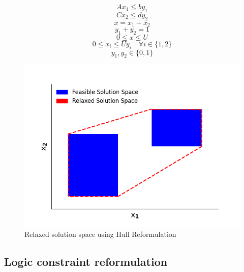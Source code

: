 \documentclass{juliacon}
\begin{document}
\begin{equation}
    \label{eq:ex_hull0}
    Ax_1 \leq by_1
\end{equation}
\begin{equation}
    \label{eq:ex_hull1}
    Cx_2 \leq dy_2
\end{equation}
\begin{equation}
    \label{eq:ex_hull2}
    x = x_1 + x_2
\end{equation}
\begin{equation}
    \label{eq:ex_hull4}
    y_1 + y_2 = 1
\end{equation}
\begin{equation}
    \label{eq:ex_hull5}
    0 \leq x \leq U
\end{equation}
\begin{equation}
    \label{eq:ex_hull3}
    0 \leq x_i \leq U y_i \quad \forall i \in \{1,2\}
\end{equation}
\begin{equation}
    \label{eq:ex_hull6}
    y_1, y_2 \in \{0,1\}
\end{equation}

\begin{figure}%
    \centering
    \includegraphics[scale=0.5]{chr.png}
    \caption{Relaxed solution space using Hull Reformulation}
    \label{fig:chr}
\end{figure}
\vskip 6pt

\subsection{Logic constraint reformulation}
\end{document}
